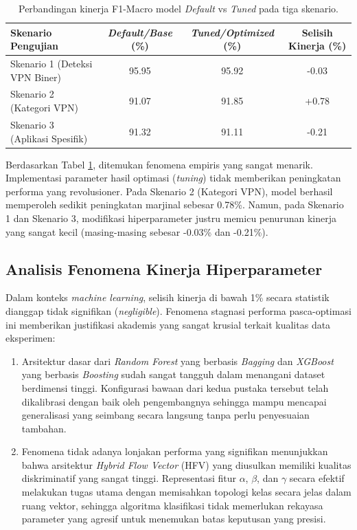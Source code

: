 \begin{table}[htbp]
    \centering
    \footnotesize
    \caption{Perbandingan kinerja F1-Macro model \textit{Default} vs \textit{Tuned} pada tiga skenario.}
    \label{tab:hasil_tuning_skenario}
    \begin{tabular}{l ccc}
        \toprule
        \textbf{Skenario Pengujian} & \textbf{\textit{Default/Base} (\%)} & \textbf{\textit{Tuned/Optimized} (\%)} & \textbf{Selisih Kinerja (\%)} \\
        \midrule
        Skenario 1 (Deteksi VPN Biner) & 95.95 & 95.92 & -0.03 \\
        Skenario 2 (Kategori VPN) & 91.07 & 91.85 & +0.78 \\
        Skenario 3 (Aplikasi Spesifik) & 91.32 & 91.11 & -0.21 \\
        \bottomrule
    \end{tabular}%
\end{table}

Berdasarkan Tabel \ref{tab:hasil_tuning_skenario}, ditemukan fenomena empiris yang sangat menarik. Implementasi parameter hasil optimasi (\textit{tuning}) tidak memberikan peningkatan performa yang revolusioner. Pada Skenario 2 (Kategori VPN), model berhasil memperoleh sedikit peningkatan marjinal sebesar 0.78\%. Namun, pada Skenario 1 dan Skenario 3, modifikasi hiperparameter justru memicu penurunan kinerja yang sangat kecil (masing-masing sebesar -0.03\% dan -0.21\%).

\subsection{Analisis Fenomena Kinerja Hiperparameter}

Dalam konteks \textit{machine learning}, selisih kinerja di bawah 1\% secara statistik dianggap tidak signifikan (\textit{negligible}). Fenomena stagnasi performa pasca-optimasi ini memberikan justifikasi akademis yang sangat krusial terkait kualitas data eksperimen:

\begin{enumerate}
    \item Arsitektur dasar dari \textit{Random Forest} yang berbasis \textit{Bagging} dan \textit{XGBoost} yang berbasis \textit{Boosting} sudah sangat tangguh dalam menangani dataset berdimensi tinggi. Konfigurasi bawaan dari kedua pustaka tersebut telah dikalibrasi dengan baik oleh pengembangnya sehingga mampu mencapai generalisasi yang seimbang secara langsung tanpa perlu penyesuaian tambahan.
    \item Fenomena tidak adanya lonjakan performa yang signifikan menunjukkan bahwa arsitektur \textit{Hybrid Flow Vector} (HFV) yang diusulkan memiliki kualitas diskriminatif yang sangat tinggi. Representasi fitur $\alpha$, $\beta$, dan $\gamma$ secara efektif melakukan tugas utama dengan memisahkan topologi kelas secara jelas dalam ruang vektor, sehingga algoritma klasifikasi tidak memerlukan rekayasa parameter yang agresif untuk menemukan batas keputusan yang presisi.
\end{enumerate}

